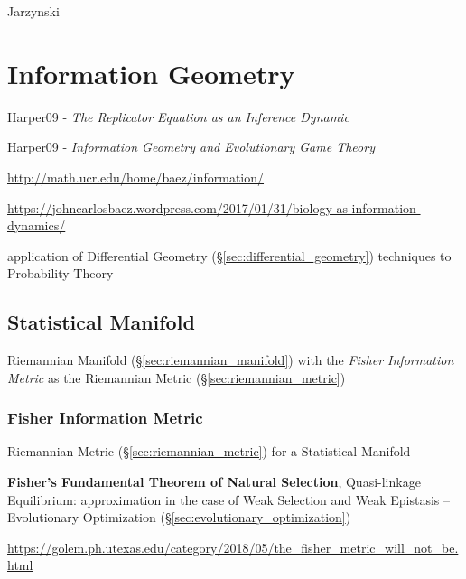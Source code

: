 Jarzynski



\section{Information Geometry}\label{sec:information_geometry}

Harper09 - \emph{The Replicator Equation as an Inference Dynamic}

Harper09 - \emph{Information Geometry and Evolutionary Game Theory}

\url{http://math.ucr.edu/home/baez/information/}

\url{https://johncarlosbaez.wordpress.com/2017/01/31/biology-as-information-dynamics/}

application of Differential Geometry
(\S\ref{sec:differential_geometry}) techniques to Probability Theory



\subsection{Statistical Manifold}\label{sec:statistical_manifold}

Riemannian Manifold (\S\ref{sec:riemannian_manifold}) with the
\emph{Fisher Information Metric} as the Riemannian Metric
(\S\ref{sec:riemannian_metric})



\subsubsection{Fisher Information Metric}\label{sec:fisher_metric}

Riemannian Metric (\S\ref{sec:riemannian_metric}) for a Statistical
Manifold

\fist \textbf{Fisher's Fundamental Theorem of Natural Selection},
Quasi-linkage Equilibrium: approximation in the case of Weak Selection
and Weak Epistasis -- Evolutionary Optimization
(\S\ref{sec:evolutionary_optimization}) %

\url{https://golem.ph.utexas.edu/category/2018/05/the_fisher_metric_will_not_be.html}



